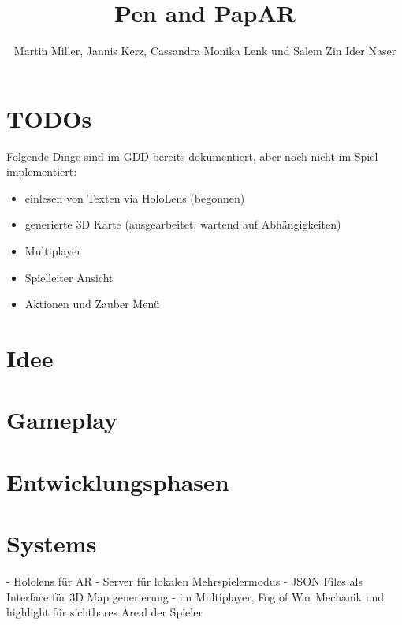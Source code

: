 \documentclass[11pt]{article}
\begin{document}
    \title{Pen and PapAR}
    \author{Martin Miller, Jannis Kerz, Cassandra Monika Lenk und Salem Zin Ider Naser}

    \maketitle
    \newpage

    \tableofcontents
    \newpage

    \section{TODOs}\label{sec:todos}
    Folgende Dinge sind im GDD bereits dokumentiert, aber noch nicht im Spiel implementiert:

    \begin{itemize}
        \item einlesen von Texten via HoloLens (begonnen)
        \item generierte 3D Karte (ausgearbeitet, wartend auf Abhängigkeiten)
        \item Multiplayer
        \item Spielleiter Ansicht
        \item Aktionen und Zauber Menü
    \end{itemize}


    \section{Idee}\label{sec:chapter_idea}
    

    \section{Gameplay}\label{sec:chapter_gameplay}
    

    \section{Entwicklungsphasen}\label{sec:chapter_dev_process}
    

    \section{Systems}\label{sec:systems}
    - Hololens für AR
    - Server für lokalen Mehrspielermodus
    - JSON Files als Interface für 3D Map generierung
    - im Multiplayer, Fog of War Mechanik und highlight für sichtbares Areal der Spieler
\end{document}
